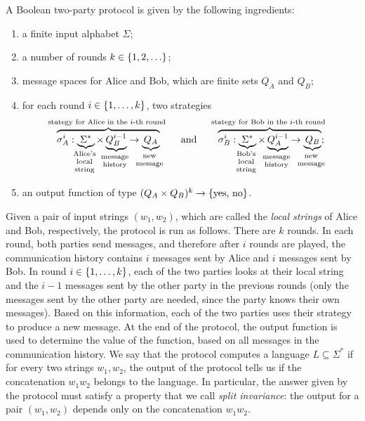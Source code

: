 \begin{definition}
    \label{def:two-party-protocol-boolean}
  A Boolean two-party protocol 
   is given by the following ingredients: 
  \begin{enumerate}
    \item a finite input alphabet $\Sigma$;
    \item a number of rounds $k \in \{1,2,\ldots\}$;
    \item message spaces for Alice and Bob, which are finite sets $Q_A$ and $Q_B$;
    \item for each round $i \in \{1,\ldots,k\}$, two strategies
    \begin{align*}
    \myoverbrace{\sigma_A^i : \myunderbrace{\Sigma^*}{Alice's \\ local\\ string} \times \myunderbrace{Q_B^{i-1}}{message \\ history}  \to \myunderbrace{Q_A}{new\\ message}}{stategy for Alice in the $i$-th round}
    \qquad \text{and} \qquad 
        \myoverbrace{\sigma_B^i : \myunderbrace{\Sigma^*}{Bob's \\ local\\ string} \times \myunderbrace{Q_A^{i-1}}{message \\ history}  \to \myunderbrace{Q_B}{new\\ message}}{stategy for Bob in the $i$-th round};
    \end{align*}
    \item an output function of type $(Q_A \times Q_B)^{k} \to \{\text{yes, no}\}$.
  \end{enumerate}
\end{definition}

Given a pair of input strings $(w_1,w_2)$, which are called the \emph{local strings} of Alice and Bob, respectively, the  protocol is run as follows. There are $k$ rounds. In each round, both parties send messages, and therefore after $i$ rounds are played, the communication history contains $i$ messages sent by Alice and $i$ messages sent by Bob.  In round  $i \in \{1,\ldots,k\}$,  each of the two parties  looks at their local string and the $i-1$ messages sent by the other party in the previous rounds (only the messages sent by the other party are needed, since the party knows their own messages). Based on this information, each of the two parties uses their strategy to produce a new message. At the end of the protocol, the output function is used to determine the value of the function, based on all messages in  the communication history. We say that the protocol computes a language $L \subseteq \Sigma^*$ if for every two strings $w_1,w_2$, the output of the protocol tells us if the concatenation $w_1w_2$ belongs to the language. In particular, the answer given by the protocol must satisfy a property that we call \emph{split invariance}: the output for a pair $(w_1,w_2)$ depends only on the concatenation $w_1w_2$. 

